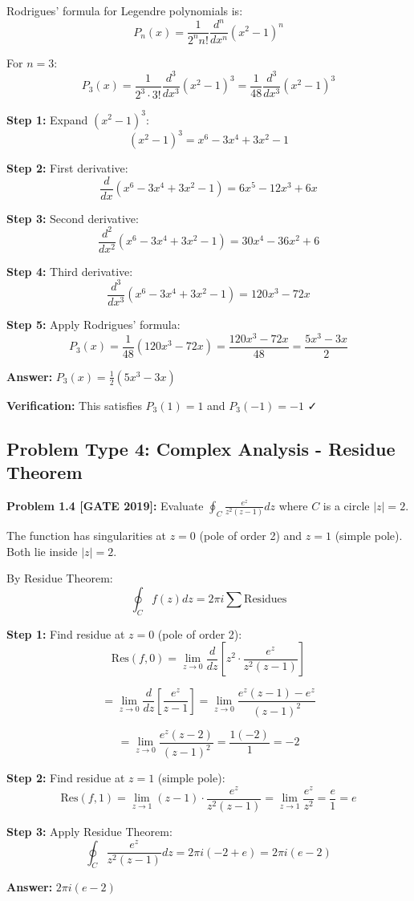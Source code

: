 \documentclass[12pt,a4paper]{article}
\begin{document}
\begin{solution}
Rodrigues' formula for Legendre polynomials is:
$$P_n(x) = \frac{1}{2^n n!}\frac{d^n}{dx^n}(x^2-1)^n$$

For $n = 3$:
$$P_3(x) = \frac{1}{2^3 \cdot 3!}\frac{d^3}{dx^3}(x^2-1)^3 = \frac{1}{48}\frac{d^3}{dx^3}(x^2-1)^3$$

\textbf{Step 1:} Expand $(x^2-1)^3$:
$$(x^2-1)^3 = x^6 - 3x^4 + 3x^2 - 1$$

\textbf{Step 2:} First derivative:
$$\frac{d}{dx}(x^6 - 3x^4 + 3x^2 - 1) = 6x^5 - 12x^3 + 6x$$

\textbf{Step 3:} Second derivative:
$$\frac{d^2}{dx^2}(x^6 - 3x^4 + 3x^2 - 1) = 30x^4 - 36x^2 + 6$$

\textbf{Step 4:} Third derivative:
$$\frac{d^3}{dx^3}(x^6 - 3x^4 + 3x^2 - 1) = 120x^3 - 72x$$

\textbf{Step 5:} Apply Rodrigues' formula:
$$P_3(x) = \frac{1}{48}(120x^3 - 72x) = \frac{120x^3 - 72x}{48} = \frac{5x^3 - 3x}{2}$$

\textbf{Answer:} $P_3(x) = \frac{1}{2}(5x^3 - 3x)$

\textbf{Verification:} This satisfies $P_3(1) = 1$ and $P_3(-1) = -1$ ✓
\end{solution}

\subsection{Problem Type 4: Complex Analysis - Residue Theorem}

\textbf{Problem 1.4 [GATE 2019]:} Evaluate $\oint_C \frac{e^z}{z^2(z-1)}dz$ where $C$ is a circle $|z| = 2$.

\begin{solution}
The function has singularities at $z = 0$ (pole of order 2) and $z = 1$ (simple pole). Both lie inside $|z| = 2$.

By Residue Theorem:
$$\oint_C f(z)dz = 2\pi i \sum \text{Residues}$$

\textbf{Step 1:} Find residue at $z = 0$ (pole of order 2):
$$\text{Res}(f, 0) = \lim_{z\to 0}\frac{d}{dz}\left[z^2 \cdot \frac{e^z}{z^2(z-1)}\right]$$

$$= \lim_{z\to 0}\frac{d}{dz}\left[\frac{e^z}{z-1}\right] = \lim_{z\to 0}\frac{e^z(z-1) - e^z}{(z-1)^2}$$

$$= \lim_{z\to 0}\frac{e^z(z-2)}{(z-1)^2} = \frac{1(-2)}{1} = -2$$

\textbf{Step 2:} Find residue at $z = 1$ (simple pole):
$$\text{Res}(f, 1) = \lim_{z\to 1}(z-1)\cdot\frac{e^z}{z^2(z-1)} = \lim_{z\to 1}\frac{e^z}{z^2} = \frac{e}{1} = e$$

\textbf{Step 3:} Apply Residue Theorem:
$$\oint_C \frac{e^z}{z^2(z-1)}dz = 2\pi i(-2 + e) = 2\pi i(e - 2)$$

\textbf{Answer:} $2\pi i(e - 2)$
\end{solution}
\end{document}
